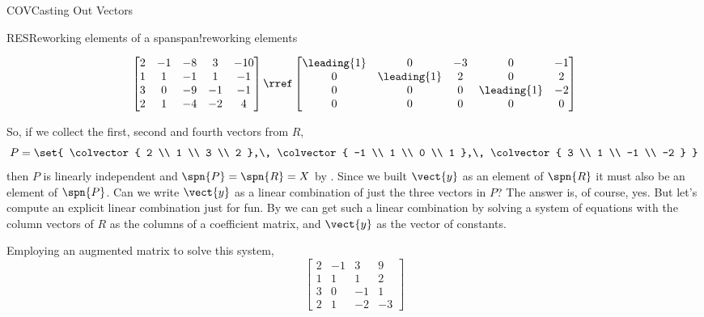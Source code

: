 \begin{subsect}{COV}{Casting Out Vectors}
\begin{example}{RES}{Reworking elements of a span}{span!reworking elements}
\begin{para}
%
\begin{equation*}
\begin{bmatrix}
 2 & -1 & -8 & 3 & -10 \\
 1 & 1 & -1 & 1 & -1 \\
 3 & 0 & -9 & -1 & -1 \\
 2 & 1 & -4 & -2 & 4
\end{bmatrix}
\rref
\begin{bmatrix}
 \leading{1} & 0 & -3 & 0 & -1 \\
 0 & \leading{1} & 2 & 0 & 2 \\
 0 & 0 & 0 & \leading{1} & -2 \\
 0 & 0 & 0 & 0 & 0
\end{bmatrix}
\end{equation*}
\end{para}
%
\begin{para}So, if we collect the first, second and fourth vectors from $R$,
%
\begin{equation*}
P=\set{
\colvector{ 2 \\ 1 \\ 3 \\ 2 },\,
\colvector{ -1 \\ 1 \\ 0 \\ 1 },\,
\colvector{ 3 \\ 1 \\ -1 \\ -2 }
}
\end{equation*}
%
then $P$ is linearly independent and $\spn{P}=\spn{R}=X$ by .  Since we built $\vect{y}$ as an element of $\spn{R}$ it must also be an element of $\spn{P}$.  Can we write $\vect{y}$ as a linear combination of just the three vectors in $P$?  The answer is, of course, yes.  But let's compute an explicit linear combination just for fun.  By  we can get such a linear combination by solving a system of equations with the column vectors of $R$ as the columns of a coefficient matrix, and $\vect{y}$ as the vector of constants.\end{para}
%
\begin{para}Employing an augmented matrix to solve this system,
%
\begin{equation*}
\begin{bmatrix}
 2 & -1 & 3 & 9 \\
 1 & 1 & 1 & 2 \\
 3 & 0 & -1 & 1 \\
 2 & 1 & -2 & -3
\end{bmatrix}

\end{equation*}
\end{para}
\end{example}
\end{subsect}
